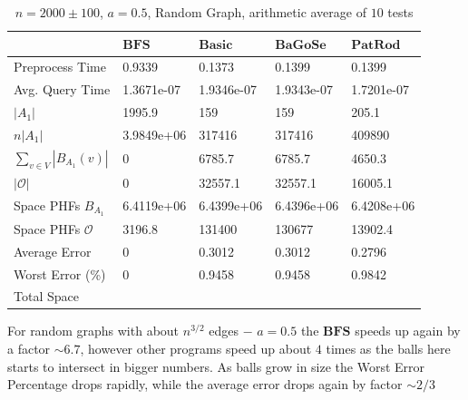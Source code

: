 \documentclass[shortabstract, lic, english]{iithesis}
\theoremstyle{definition} \newtheorem{definition}{Definition}[chapter]
\theoremstyle{plain} \newtheorem{remark}[definition]{Observation}
\theoremstyle{plain} \newtheorem{theorem}[definition]{Theorem}
\theoremstyle{plain} \newtheorem{lemma}[definition]{Lemma}
\theoremstyle{plain} \newtheorem{conjecture}[definition]{Conjecture}
\begin{document}
\begin{table}[H] \label{test:random.a0.5}
    \centering
    \begin{tabular}{ |p{3cm}||p{2cm}|p{2cm}|p{2cm}|p{2cm}|  } 
        \hline
        & $\mathbf{BFS}$ & $\mathbf{Basic}$ & $\mathbf{BaGoSe}$ & $\mathbf{PatRod}$ \\
        \hline
        \hline
        Preprocess Time                 & 0.9339     & 0.1373     & 0.1399      & 0.1399     \\
        \hline
        Avg. Query Time                 & 1.3671e-07 & 1.9346e-07 & 1.9343e-07  & 1.7201e-07 \\
        \hline
        $|A_1|$                         & 1995.9     & 159        & 159         & 205.1      \\
        \hline
        $n |A_1|$                       & 3.9849e+06 & 317416     & 317416      & 409890     \\
        \hline
        $\sum_{v \in V} |B_{A_1}(v)| $  & 0          & 6785.7     & 6785.7      & 4650.3     \\
        \hline
        $|\mathcal{O}|$                 & 0          & 32557.1    & 32557.1     & 16005.1    \\
        \hline
        Space PHFs $B_{A_1}$            & 6.4119e+06 & 6.4399e+06 & 6.4396e+06  & 6.4208e+06 \\
        \hline
        Space PHFs $\mathcal{O}$        & 3196.8     & 131400     & 130677      & 13902.4    \\
        \hline
        Average Error                   & 0          & 0.3012     & 0.3012      & 0.2796     \\
        \hline
        Worst Error (\%)                & 0          & 0.9458     & 0.9458      & 0.9842     \\
        \hline
        Total Space                     &            &            &             &            \\
        \hline

    \end{tabular}
    \caption{$n = 2000 \pm 100$, $a = 0.5$, Random Graph, arithmetic average of $10$ tests}
\end{table}

For random graphs with about $n^{3/2}$ edges $-$ $a = 0.5$ the $\mathbf{BFS}$ speeds up again by a factor $\sim 6.7$, however other programs
speed up about $4$ times as the balls here starts to intersect in bigger numbers.
As balls grow in size the Worst Error Percentage drops rapidly, while the average error drops again by factor $\sim 2/3$
\end{document}
